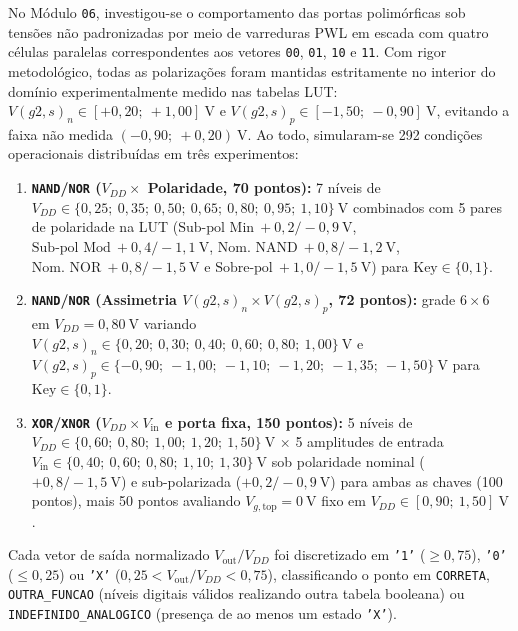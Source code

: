 No M\'{o}dulo \texttt{06}, investigou-se o comportamento das portas polim\'{o}rficas sob tens\~{o}es n\~{a}o padronizadas por meio de varreduras PWL em escada com quatro c\'{e}lulas paralelas correspondentes aos vetores \texttt{00}, \texttt{01}, \texttt{10} e \texttt{11}. Com rigor metodol\'{o}gico, todas as polariza\c{c}\~{o}es foram mantidas estritamente no interior do dom\'{i}nio experimentalmente medido nas tabelas LUT: $V(g2,s)_n \in [+0{,}20;\ +1{,}00]\ \text{V}$ e $V(g2,s)_p \in [-1{,}50;\ -0{,}90]\ \text{V}$, evitando a faixa n\~{a}o medida $(-0{,}90;\ +0{,}20)\ \text{V}$. Ao todo, simularam-se 292 condi\c{c}\~{o}es operacionais distribu\'{i}das em tr\^{e}s experimentos:
\begin{enumerate}
    \item \textbf{\texttt{NAND}/\texttt{NOR} ($V_{DD} \times$ Polaridade, 70 pontos):} 7 n\'{i}veis de $V_{DD} \in \{0{,}25;\allowbreak\ 0{,}35;\allowbreak\ 0{,}50;\allowbreak\ 0{,}65;\allowbreak\ 0{,}80;\allowbreak\ 0{,}95;\allowbreak\ 1{,}10\}\ \text{V}$ combinados com 5 pares de polaridade na LUT ($\text{Sub-pol Min}\ +0{,}2/-0{,}9\ \text{V}$, $\text{Sub-pol Mod}\ +0{,}4/-1{,}1\ \text{V}$, $\text{Nom.\ NAND}\ +0{,}8/-1{,}2\ \text{V}$, $\text{Nom.\ NOR}\ +0{,}8/-1{,}5\ \text{V}$ e $\text{Sobre-pol}\ +1{,}0/-1{,}5\ \text{V}$) para $\text{Key} \in \{0, 1\}$.
    \item \textbf{\texttt{NAND}/\texttt{NOR} (Assimetria $V(g2,s)_n \times V(g2,s)_p$, 72 pontos):} grade $6 \times 6$ em $V_{DD} = 0{,}80\ \text{V}$ variando $V(g2,s)_n \in \{0{,}20;\allowbreak\ 0{,}30;\allowbreak\ 0{,}40;\allowbreak\ 0{,}60;\allowbreak\ 0{,}80;\allowbreak\ 1{,}00\}\ \text{V}$ e $V(g2,s)_p \in \{-0{,}90;\allowbreak\ -1{,}00;\allowbreak\ -1{,}10;\allowbreak\ -1{,}20;\allowbreak\ -1{,}35;\allowbreak\ -1{,}50\}\ \text{V}$ para $\text{Key} \in \{0, 1\}$.
    \item \textbf{\texttt{XOR}/\texttt{XNOR} ($V_{DD} \times V_{\mathrm{in}}$ e porta fixa, 150 pontos):} 5 n\'{i}veis de $V_{DD} \in \{0{,}60;\allowbreak\ 0{,}80;\allowbreak\ 1{,}00;\allowbreak\ 1{,}20;\allowbreak\ 1{,}50\}\ \text{V}$ $\times$ 5 amplitudes de entrada $V_{\mathrm{in}} \in \{0{,}40;\allowbreak\ 0{,}60;\allowbreak\ 0{,}80;\allowbreak\ 1{,}10;\allowbreak\ 1{,}30\}\ \text{V}$ sob polaridade nominal ($+0{,}8/-1{,}5\ \text{V}$) e sub-polarizada ($+0{,}2/-0{,}9\ \text{V}$) para ambas as chaves (100 pontos), mais 50 pontos avaliando $V_{g,\mathrm{top}} = 0\ \text{V}$ fixo em $V_{DD} \in [0{,}90;\ 1{,}50]\ \text{V}$.
\end{enumerate}
Cada vetor de sa\'{i}da normalizado $V_{\mathrm{out}}/V_{DD}$ foi discretizado em \texttt{'1'} ($\ge 0{,}75$), \texttt{'0'} ($\le 0{,}25$) ou \texttt{'X'} ($0{,}25 < V_{\mathrm{out}}/V_{DD} < 0{,}75$), classificando o ponto em \texttt{CORRETA}, \texttt{OUTRA\_FUNCAO} (n\'{i}veis digitais v\'{a}lidos realizando outra tabela booleana) ou \texttt{INDEFINIDO\_ANALOGICO} (presen\c{c}a de ao menos um estado \texttt{'X'}).

